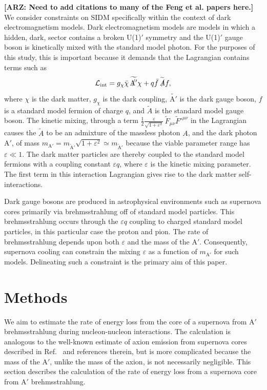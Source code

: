 \documentclass[nofootinbib,prd,superscriptaddress,twocolumn]{revtex4}
\newcommand{\Aprime}{\mathrm{A}'}
\newcommand{\arz}[1]{{{\bf{\color{BrickRed}[ARZ: #1]}}}}
\begin{document}
\arz{Need to add citations to many of the Feng et al. papers here.}
We consider constraints on SIDM specifically within the context of dark electromagnetism models. 
Dark electromagnetism models are models in which a hidden, dark, sector contains a broken U(1)$'$ 
symmetry and the U(1)$'$ gauge boson is kinetically mixed with the standard model photon. For the 
purposes of this study, this is important because it demands that the Lagrangian contains terms such as 
%
\begin{equation}
\mathcal{L}_{\mathrm{int}} = g_{\chi} \bar{\chi} \, \widetilde{\slashed{\Aprime}} \chi + q \bar{f}\, \widetilde{\slashed{A}} f, 
\end{equation}
%
where $\chi$ is the dark matter, $g_{\chi}$ is the dark coupling, $\widetilde{\Aprime}$ is the dark gauge boson, 
$f$ is a standard model fermion of charge $q$, and $\widetilde{A}$ is the standard model gauge boson. 
The kinetic mixing, through a term 
$\frac{1}{2}\frac{\varepsilon}{\sqrt{1+\varepsilon^2}}\, \widetilde{F}_{\mu \nu}\widetilde{F}'^{\mu \nu}$ 
in the Lagrangian causes the $\widetilde{A}$ to be an admixture of the massless photon $A$, 
and the dark photon $\Aprime$, 
of mass $m_{\mathrm{\Aprime}} = m_{\mathrm{\widetilde{A}'}} \sqrt{1 + \varepsilon^2} \simeq m_\mathrm{{\widetilde{A}'}}$ because 
the viable parameter range has $\varepsilon \ll 1$. The dark matter particles are thereby coupled 
to the standard model fermions with a coupling constant $\varepsilon q$, 
where $\varepsilon$ is the kinetic mixing parameter. The first term in this 
interaction Lagrangian gives rise to the dark matter self-interactions. 

Dark gauge bosons are produced in astrophysical environments such as supernova 
cores primarily via brehmsstrahlung off of standard model particles. This brehmsstrahlung 
occurs through the $\varepsilon q$ coupling to charged standard model particles, 
in this  particular case the proton and pion. The rate of brehmsstrahlung 
depends upon both $\varepsilon$ and the mass of the $\Aprime$. Consequently, 
supernova cooling can constrain the mixing $\varepsilon$ as a function of 
$m_{\Aprime}$ for such models. Delineating such a constraint is the 
primary aim of this paper.


\section{Methods}
\label{section:computational}
	
We aim to estimate the rate of energy loss from the core of a supernova from $\Aprime$ brehmsstrahlung 
during nucleon-nucleon interactions. The calculation is analogous to the well-known estimate of axion 
emission from supernova cores described in Ref.~\cite{raffelt96_book} and references therein, but is 
more complicated because the mass of the $\Aprime$, unlike the mass of the axion, is not necessarily 
negligible. This section describes the calculation of the rate of energy loss from a supernova core 
from $\Aprime$ brehmsstrahlung. 
\end{document}
